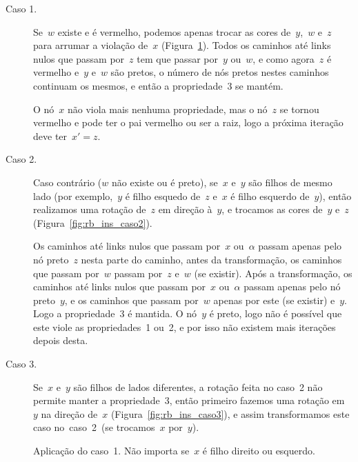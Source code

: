 \documentclass[../../main.tex]{subfiles}
\begin{document}
\begin{description}
	\item[Caso 1.] Se~$w$ existe e é vermelho, podemos apenas trocar as cores de~$y$,~$w$ e~$z$ para arrumar a violação de~$x$ (Figura~\ref{fig:rb_ins_caso1}). Todos os caminhos até links nulos que passam por~$z$ tem que passar por~$y$ ou~$w$, e como agora~$z$ é vermelho e~$y$ e~$w$ são pretos, o número de nós pretos nestes caminhos continuam os mesmos, e então a propriedade~3 se mantém.

	O nó~$x$ não viola mais nenhuma propriedade, mas o nó~$z$ se tornou vermelho e pode ter o pai vermelho ou ser a raiz, logo a próxima iteração deve ter~$x' = z$.

\item[Caso 2.] Caso contrário ($w$ não existe ou é preto), se~$x$ e~$y$ são filhos de mesmo lado (por exemplo,~$y$ é filho esquedo de~$z$ e~$x$ é filho esquerdo de~$y$), então realizamos uma rotação de~$z$ em direção à~$y$, e trocamos as cores de~$y$ e~$z$ (Figura~\ref{fig:rb_ins_caso2}).

	Os caminhos até links nulos que passam por~$x$ ou~$\alpha$ passam apenas pelo nó preto~$z$ nesta parte do caminho, antes da transformação, os caminhos que passam por~$w$ passam por~$z$ e~$w$ (se existir). Após a transformação, os caminhos até links nulos que passam por~$x$ ou~$\alpha$ passam apenas pelo nó preto~$y$, e os caminhos que passam por~$w$ apenas por este (se existir) e~$y$. Logo a propriedade~3 é mantida. O nó~$y$ é preto, logo não é possível que este viole as propriedades~1 ou~2, e por isso não existem mais iterações depois desta.

\item[Caso 3.] Se~$x$ e~$y$ são filhos de lados diferentes, a rotação feita no caso~2 não permite manter a propriedade~3, então primeiro fazemos uma rotação em~$y$ na direção de~$x$ (Figura~\ref{fig:rb_ins_caso3}), e assim transformamos este caso no~caso~2~(se trocamos~$x$ por~$y$).

\end{description}

\begin{figure}
\centering
{}
\caption{Aplicação do caso~1. Não importa se~$x$ é filho direito ou esquerdo.} \label{fig:rb_ins_caso1}
\end{figure}
\end{document}
